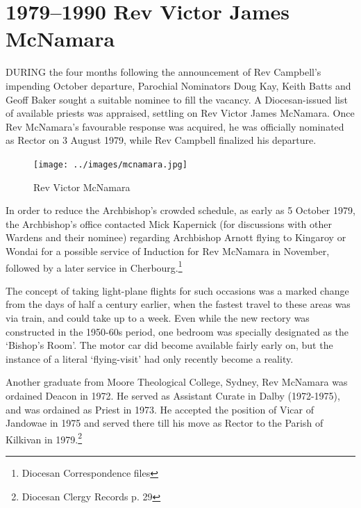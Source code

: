 \printendnotes[custom]
\setcounter{endnote}{0}
\chapter{1979--1990 Rev Victor James McNamara}
\nobalance


\lettrine[lines=3]{D}{URING}
 the four months following the announcement of Rev Campbell's impending October departure, Parochial Nominators Doug Kay, Keith Batts and Geoff Baker sought a suitable nominee to fill the vacancy. A Diocesan-issued list of available priests was appraised, settling on Rev Victor James McNamara. Once Rev McNamara's favourable response was acquired, he was officially nominated as Rector on 3 August 1979, while Rev Campbell finalized his departure.







\begin{figure}
\begin{center}
\texttt{[image: ../images/mcnamara.jpg]}
\caption{Rev Victor McNamara}
\end{center}
\end{figure}




In order to reduce the Archbishop's crowded schedule, as early as 5 October 1979, the Archbishop's office contacted Mick Kapernick (for discussions with other Wardens and their nominee) regarding Archbishop Arnott flying to Kingaroy or Wondai for a possible service of Induction for Rev McNamara in November, followed by a later service in Cherbourg.\footnote{Diocesan Correspondence files}


The concept of taking light-plane flights for such occasions was a marked change from the days of half a century earlier, when the fastest travel to these areas was via train, and could take up to a week. Even while the new rectory was constructed in the 1950-60s period, one bedroom was specially designated as the `Bishop's Room'. The motor car did become available fairly early on, but the instance of a literal `flying-visit' had only recently become a reality.



Another graduate from Moore Theological College, Sydney, Rev McNamara was ordained Deacon in 1972. He served as Assistant Curate in Dalby (1972-1975), and was ordained as Priest in 1973. He accepted the position of Vicar of Jandowae in 1975 and served there till his move as Rector to the Parish of Kilkivan in 1979.\footnote{Diocesan Clergy Records p. 29}


